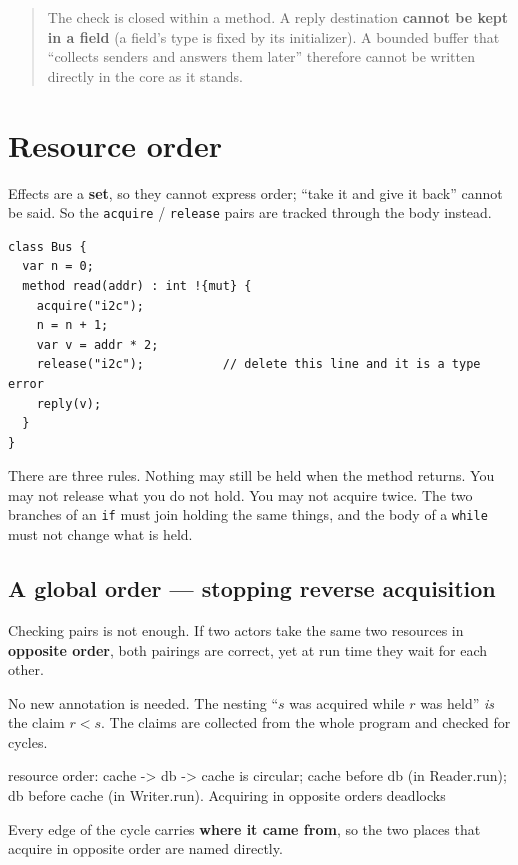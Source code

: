 \documentclass[11pt,a4paper]{article}
\begin{document}
\begin{quote}\small
The check is closed within a method. A reply destination \textbf{cannot be kept
in a field} (a field's type is fixed by its initializer). A bounded buffer that
``collects senders and answers them later'' therefore cannot be written
directly in the core as it stands.
\end{quote}

\section{Resource order}
\label{sec:resorder}

Effects are a \textbf{set}, so they cannot express order; ``take it and give it
back'' cannot be said. So the \texttt{acquire} / \texttt{release} pairs are
tracked through the body instead.

\begin{lstlisting}
class Bus {
  var n = 0;
  method read(addr) : int !{mut} {
    acquire("i2c");
    n = n + 1;
    var v = addr * 2;
    release("i2c");           // delete this line and it is a type error
    reply(v);
  }
}
\end{lstlisting}

There are three rules. Nothing may still be held when the method returns. You
may not release what you do not hold. You may not acquire twice. The two
branches of an \texttt{if} must join holding the same things, and the body of a
\texttt{while} must not change what is held.

\subsection{A global order --- stopping reverse acquisition}

Checking pairs is not enough. If two actors take the same two resources in
\textbf{opposite order}, both pairings are correct, yet at run time they wait
for each other.

No new annotation is needed. The nesting ``$s$ was acquired while $r$ was
held'' \emph{is} the claim $r < s$. The claims are collected from the whole
program and checked for cycles.

\begin{term}
resource order: cache -> db -> cache is circular;
  cache before db (in Reader.run); db before cache (in Writer.run).
  Acquiring in opposite orders deadlocks
\end{term}

Every edge of the cycle carries \textbf{where it came from}, so the two places
that acquire in opposite order are named directly.
\end{document}
